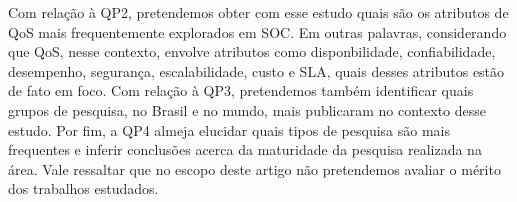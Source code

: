 
Com rela\c{c}\~{a}o \`{a} QP2, pretendemos obter com esse estudo quais s\~{a}o os atributos de QoS mais frequentemente explorados em SOC. Em outras palavras, considerando que QoS, nesse contexto, envolve atributos como disponbilidade, confiabilidade, desempenho, seguran\c{c}a, escalabilidade, custo e SLA, quais desses atributos est\~{a}o de fato em foco. Com rela\c{c}\~{a}o \`{a} QP3, pretendemos tamb\'{e}m identificar       quais grupos de pesquisa, no Brasil e no mundo, mais publicaram no contexto desse estudo. Por fim, a QP4 almeja elucidar quais tipos de pesquisa s\~{a}o mais frequentes e inferir conclusões acerca da maturidade da pesquisa realizada na \'{a}rea. Vale ressaltar que no escopo deste artigo n\~{a}o pretendemos avaliar o m\'{e}rito dos trabalhos estudados.


